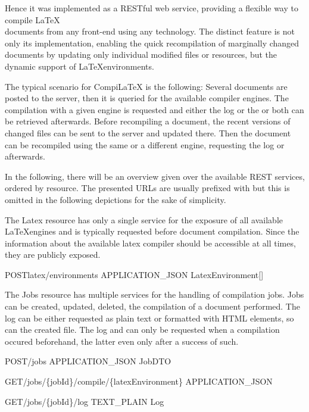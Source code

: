 Hence it was implemented as a RESTful web service, providing a flexible way to compile \LaTeX \\ documents from any front-end using any technology. The distinct feature is not only its implementation, enabling the quick recompilation of marginally changed documents by updating only individual modified files or resources, but the dynamic support of \LaTeX environments.

The typical scenario for CompiLaTeX is the following: Several documents are posted to the server, then it is queried for the available compiler engines. The compilation with a given engine is requested and either the log or the  or both can be retrieved afterwards. Before recompiling a document, the recent versions of changed files can be sent to the server and updated there. Then the document can be recompiled using the same or a different engine, requesting the log or  afterwards.

In the following, there will be an overview given over the available REST services, ordered by resource. The presented URLs are usually prefixed with  but this is omitted in the following depictions for the sake of simplicity.


The Latex resource has only a single service for the exposure of all available \LaTeX engines and is typically requested before document compilation. Since the information about the available latex compiler should be accessible at all times, they are publicly exposed.

{POST}{latex/environments}
{}{APPLICATION\_JSON}
{LatexEnvironment[]}


The Jobs resource has multiple services for the handling of compilation jobs. Jobs can be created, updated, deleted, the compilation of a document performed. The log can be either requested as plain text or formatted with HTML elements, so can the created  file. The log and  can only be requested when a compilation occured beforehand, the latter even only after a success of such.

{POST}{/jobs}
{}{APPLICATION\_JSON}
{JobDTO}

{GET}{/jobs/\{jobId\}/compile/\{latexEnvironment\}}
{}{APPLICATION\_JSON}
{}

{GET}{/jobs/\{jobId\}/log}
{}{TEXT\_PLAIN}
{Log}

